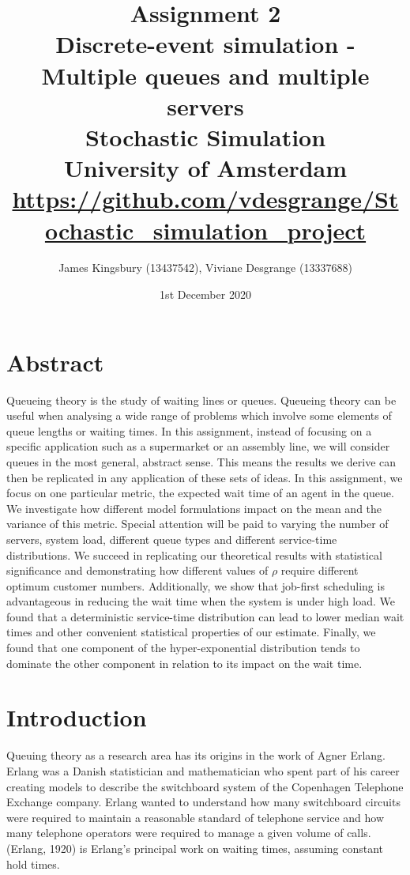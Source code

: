 \documentclass{article}
\title{Assignment 2 \\  Discrete-event simulation - Multiple queues and multiple servers \\ \large Stochastic Simulation \\University of Amsterdam\\
\href{https://github.com/vdesgrange/Stochastic_simulation_project}{https://github.com/vdesgrange/Stochastic\_simulation\_project}}
\author{James Kingsbury (13437542), Viviane Desgrange (13337688) }
\date{1st December 2020}
\begin{document}
    \begin{titlingpage}
        \maketitle
    \end{titlingpage}


    \section*{Abstract}
    Queueing theory is the study of waiting lines or queues. Queueing theory can be useful when analysing a wide range of problems which involve some elements of queue lengths or waiting times. In this assignment, instead of focusing on a specific application such as a supermarket or an assembly line, we will consider queues in the most general, abstract sense. This means the results we derive can then be replicated in any application of these sets of ideas. In this assignment, we focus on one particular metric, the expected wait time of an agent in the queue. We investigate how different model formulations impact on the mean and the variance of this metric. Special attention will be paid to varying the number of servers, system load, different queue types and different service-time distributions. We succeed in replicating our theoretical results with statistical significance and demonstrating how different values of $\rho$ require different optimum customer numbers. Additionally, we show that job-first scheduling is advantageous in reducing the wait time when the system is under high load. We found that a deterministic service-time distribution can lead to lower median wait times and other convenient statistical properties of our estimate. Finally, we found that one component of the hyper-exponential distribution tends to dominate the other component in relation to its impact on the wait time.

    \section*{Introduction}
    Queuing theory as a research area has its origins in the work of Agner Erlang. Erlang was a Danish statistician and mathematician who spent part of his career creating models to describe the switchboard system of the Copenhagen Telephone Exchange company. Erlang wanted to understand how many switchboard circuits were required to maintain a reasonable standard of telephone service and how many telephone operators were required to manage a given volume of calls. (Erlang, 1920) is Erlang's principal work on waiting times, assuming constant hold times.
\end{document}
